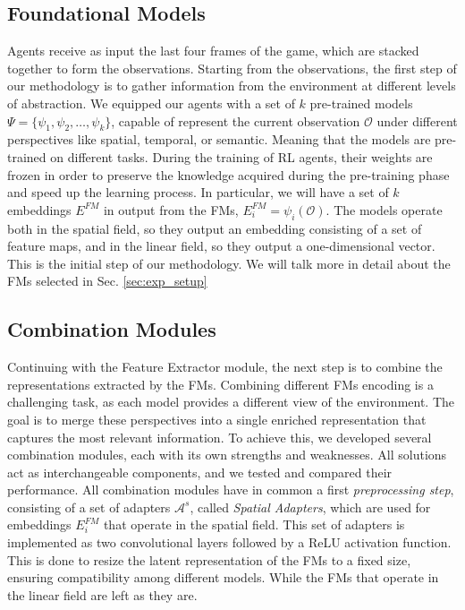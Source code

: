 \subsection{Foundational Models}\label{subsec:foundational-models}
Agents receive as input the last four frames of the game, which are stacked together to form the observations.
Starting from the observations, the first step of our methodology is to gather information from the environment at different levels of abstraction.
We equipped our agents with a set of $k$ pre-trained models $\Psi = \{\psi_1, \psi_2, \ldots, \psi_k\}$, capable of represent the current observation $\mathcal{O}$ under different perspectives like spatial, temporal, or semantic.
Meaning that the models are pre-trained on different tasks.
During the training of RL agents, their weights are frozen in order to preserve the knowledge acquired during the pre-training phase and speed up the learning process.
In particular, we will have a set of $k$ embeddings $E^{FM}$ in output from the FMs, $E^{FM}_i = \psi_i(\mathcal{O})$.
The models operate both in the spatial field, so they output an embedding consisting of a set of feature maps, and in the linear field, so they output a one-dimensional vector.
This is the initial step of our methodology.
We will talk more in detail about the FMs selected in Sec. \ref{sec:exp_setup}

\subsection{Combination Modules}\label{subsec:combination-modules}
Continuing with the Feature Extractor module, the next step is to combine the representations extracted by the FMs.
Combining different FMs encoding is a challenging task, as each model provides a different view of the environment.
The goal is to merge these perspectives into a single enriched representation that captures the most relevant information.
To achieve this, we developed several combination modules, each with its own strengths and weaknesses.
All solutions act as interchangeable components, and we tested and compared their performance.
All combination modules have in common a first \textit{preprocessing step}, consisting of a set of adapters $\mathcal{A}^{s}$, called \textit{Spatial Adapters}, which are used for embeddings $E^{FM}_i$ that operate in the spatial field.
This set of adapters is implemented as two convolutional layers followed by a ReLU activation function.
This is done to resize the latent representation of the FMs to a fixed size, ensuring compatibility among different models.
While the FMs that operate in the linear field are left as they are.

